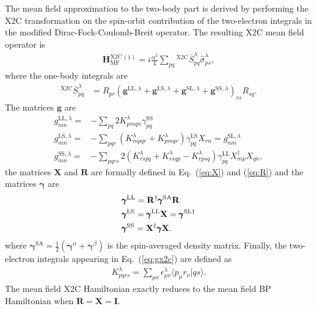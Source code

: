 \documentclass[10pt,aps,prb,twocolumn,amsmath,amssymb,superscriptaddress]{revtex4-1}
\renewcommand\b[1]{\ensuremath{\mathbf{#1}}}
\newcommand\B[1]  {\ensuremath{\pmb #1}}
\begin{document}
The mean field approximation to the two-body part is derived by performing the X2C transformation on the spin-orbit contribution of the two-electron integrals in the modified Dirac-Fock-Coulomb-Breit operator\cite{Li2014}.
The resulting X2C mean field operator is
\begin{align}
    \b{H}^\text{X2C}_\text{MF}{}^{(1)}=i\frac{\alpha^2}{4} \sum_{pq} {}^\text{X2C}\!\bar{S}^\lambda_{pq} \hat{\sigma}_{ps}^\lambda
    \label{eq:X2Csomf}
,\end{align}
where the one-body integrals are
\begin{align}
    {}^\text{X2C}\!\bar{S}^\lambda_{pq} &= R_{pr} \left( \b{g}^{\text{LL},\lambda} + \b{g}^{\text{LS},\lambda} + \b{g}^{\text{SL},\lambda} + \b{g}^{\text{SS},\lambda} \right)_{rs}R_{sq}
    \label{eq:Sx2cmf}
.\end{align}
The matrices $\b{g}$ are
\begin{align}
    g^{\text{LL},\lambda}_{mn} =& -\sum_{pq}        2K^\lambda_{pmqn}                                             \gamma^\text{SS}_{pq}             \nonumber\\
    g^{\text{LS},\lambda}_{mn} =& -\sum_{pqr}  \left(K^\lambda_{mpqr} + K^\lambda_{pmqr}                   \right)\gamma^\text{LS}_{pq} X_{rn}      =g^{\text{SL},\lambda}_{nm}\label{eq:gx2c}\\
    g^{\text{SS},\lambda}_{mn} =& -\sum_{pqrs}2\left(K^\lambda_{rspq} + K^\lambda_{rsqp} - K^\lambda_{rpsq}\right)\gamma^\text{LL}_{pq} X^\dag_{mp}X_{qn}\nonumber
,\end{align}
the matrices $\b{X}$ and $\b{R}$ are formally defined in Eq.~(\ref{eq:X}) and (\ref{eq:R})
and the matrices $\B{\gamma}$ are
\begin{align}
    &\B{\gamma}^\text{LL} = \b{R}^\dag \B{\gamma}^\text{SA} \b{R}\\
    &\B{\gamma}^\text{LS} = \B{\gamma}^\text{LL} \b{X} =\B{\gamma}^\text{SL\dag}  \label{eq:gamma}\\
    &\B{\gamma}^\text{SS} = \b{X}^\dag \B{\gamma} \b{X}.
\end{align}
where $\B{\gamma}^\text{SA}=\tfrac{1}{2}(\B{\gamma}^\alpha+\B{\gamma}^\beta)$ is the spin-averaged density matrix. 
Finally, the two-electron integrals appearing in Eq.~(\ref{eq:gx2c}) are defined as
\begin{align}
K^\lambda_{pqrs} = \sum_{\mu\nu}\epsilon^\lambda_{\mu\nu}\langle p_\mu r_\nu |qs \rangle
\label{eq:Kx2c}
.\end{align}
The mean field X2C Hamiltonian exactly reduces to the mean field BP Hamiltonian when $\b{R} = \b{X} = \b{I}$. 
\end{document}
